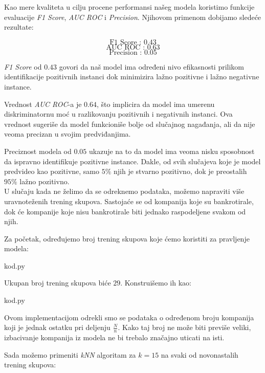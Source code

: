\documentclass[12pt]{article}
\theoremstyle{definition}
\theoremstyle{remark}
\begin{document}
Kao mere kvaliteta u cilju procene performansi našeg modela koristimo funkcije evaluacije  \emph{F1 Score}, \emph{AUC ROC} i \emph{Precision}. Njihovom primenom dobijamo sledeće rezultate:

\hfill

$$
\text{F1 Score : 0.43}
$$
$$
\text{AUC ROC : 0.63}
$$
$$
\text{Precision : 0.05}
$$
\hfill


\emph{F1 Score} od $0.43$ govori da naš model ima određeni nivo efikasnosti prilikom identifikacije pozitivnih instanci dok minimizira lažno pozitivne i lažno negativne instance.

 Vrednost \emph{AUC ROC}-a je $0.64$, što implicira da model ima umerenu diskriminatornu moć u razlikovanju pozitivnih i negativnih instanci. Ova vrednost sugeriše da model funkcioniše bolje od slučajnog nagađanja, ali da nije veoma precizan u svojim predviđanjima.

Preciznost modela od $0.05$ ukazuje na to da model ima veoma nisku sposobnost da ispravno identifikuje pozitivne instance. Dakle, od svih slučajeva koje je model predvideo kao pozitivne, samo $5\%$ njih je stvarno pozitivno, dok je preostalih $95\%$ lažno pozitivno.\\




 U slučaju kada ne želimo da se odreknemo podataka, možemo napraviti više uravnoteženih trening skupova. Sastojaće se od kompanija koje su bankrotirale, dok će kompanije koje nisu bankrotirale biti jednako raspodeljene svakom od njih. 
 
 Za početak, određujemo broj trening skupova koje ćemo koristiti za pravljenje modela:
\vspace{0.1cm} 
\hfill

{kod.py}
\hfill


Ukupan broj trening skupova biće $29$. Konstruišemo ih kao:

\hfill

{kod.py}

\hfill


Ovom implementacijom odrekli smo se podataka o određenom broju kompanija koji je jednak ostatku pri deljenju $\frac{N}{n}$. Kako taj broj ne može biti previše veliki, izbacivanje kompanija iz modela ne bi trebalo značajno uticati na isti.


Sada možemo primeniti \emph{kNN} algoritam za $k=15$ na svaki od novonastalih trening skupova:
\end{document}
